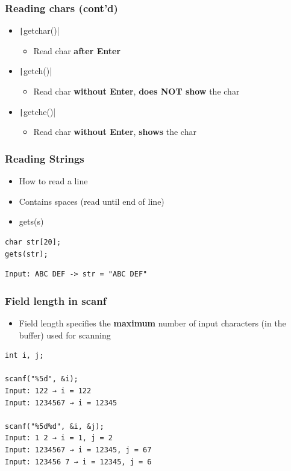 \documentclass{../c-lecture}
\begin{document}
\begin{frame}
  \frametitle{Reading chars (cont’d)}
  \begin{itemize}
    \item \texttt|getchar()|
    \begin{itemize}
      \item Read char \textbf{\color{Orange} after Enter}
    \end{itemize}
    \item \texttt|getch()|
    \begin{itemize}
      \item
        Read char \textbf{\color{Orange} without Enter},
        \textbf{\color{LimeGreen} does NOT show} the char
    \end{itemize}
    \item \texttt|getche()|
    \begin{itemize}
      \item
        Read char \textbf{\color{Orange} without Enter},
        \textbf{\color{LimeGreen} shows} the char
    \end{itemize}
  \end{itemize}
\end{frame}

\begin{frame}[fragile]
  \frametitle{Reading Strings}
  \begin{itemize}
    \item How to read a line
    \item Contains spaces (read until end of line)
    \item gets(s)
  \end{itemize}
  \begin{verbatim}
char str[20];
gets(str);
  \end{verbatim}
  \begin{verbatim}
Input: ABC DEF -> str = "ABC DEF"
  \end{verbatim}
\end{frame}

\begin{frame}[fragile]
  \frametitle{Field length in scanf}
  \begin{itemize}
    \item
      Field length specifies the \textbf{\color{Orange} maximum} number
      of input characters (in the buffer) used for scanning

  \end{itemize}
  \begin{verbatim}
int i, j;

scanf("%5d", &i);
Input: 122 → i = 122
Input: 1234567 → i = 12345

scanf("%5d%d", &i, &j);
Input: 1 2 → i = 1, j = 2
Input: 1234567 → i = 12345, j = 67
Input: 123456 7 → i = 12345, j = 6
  \end{verbatim}
\end{frame}
\end{document}
